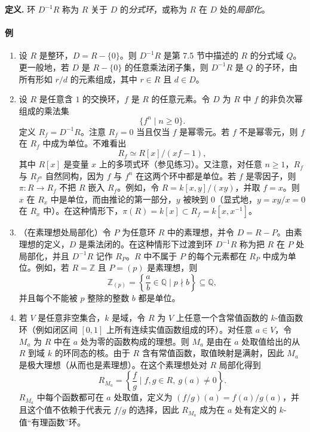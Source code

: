 \noindent\textbf{定义.} 环 $D^{-1}R$ 称为 $R$ 关于 $D$ 的\emph{分式环}，或称为 $R$ 在 $D$ 处的\emph{局部化}。

\paragraph{例}
\begin{enumerate}[label=(\arabic*)]
	\item 设 $R$ 是整环，$D=R-\{0\}$。则 $D^{-1}R$ 是第 7.5 节中描述的 $R$ 的分式域 $Q$。更一般地，若 $D$ 是 $R-\{0\}$ 的任意乘法闭子集，则 $D^{-1}R$ 是 $Q$ 的子环，由所有形如 $r/d$ 的元素组成，其中 $r\in R$ 且 $d\in D$。
	
	\item 设 $R$ 是任意含 $1$ 的交换环，$f$ 是 $R$ 的任意元素。令 $D$ 为 $R$ 中 $f$ 的非负次幂组成的乘法集
	\[
	\{f^n\mid n\ge0\}.
	\]
	定义 $R_f=D^{-1}R$。注意 $R_f=0$ 当且仅当 $f$ 是幂零元。若 $f$ 不是幂零元，则 $f$ 在 $R_f$ 中成为单位。不难看出
	\[
	R_f\simeq R[x]/(xf-1),
	\]
	其中 $R[x]$ 是变量 $x$ 上的多项式环（参见练习）。又注意，对任意 $n\ge1$，$R_f$ 与 $R_{f^n}$ 自然同构，因为 $f$ 与 $f^n$ 在这两个环中都是单位。若 $f$ 是零因子，则 $\pi:R\to R_f$ 不把 $R$ 嵌入 $R_f$。例如，令 $R=k[x,y]/(xy)$，并取 $f=x$。则 $x$ 在 $R_x$ 中是单位，而由推论的第一部分，$y$ 被映到 $0$（显式地，$y=xy/x=0$ 在 $R_x$ 中）。在这种情形下，$\pi(R)=k[x]\subset R_f=k[x,x^{-1}]$。
	
	\item （在素理想处局部化）令 $P$ 为任意环 $R$ 中的素理想，并令 $D=R-P$。由素理想的定义，$D$ 是乘法闭的。在这种情形下过渡到环 $D^{-1}R$ 称为把 $R$ 在 $P$ 处局部化，并且 $D^{-1}R$ 记作 $R_P$。$R$ 中不属于 $P$ 的每个元素都在 $R_P$ 中成为单位。例如，若 $R=\mathbb Z$ 且 $P=(p)$ 是素理想，则
	\[
	\mathbb Z_{(p)}=\left\{\frac{a}{b}\in\mathbb Q\mid p\nmid b\right\}\subseteq\mathbb Q,
	\]
	并且每个不能被 $p$ 整除的整数 $b$ 都是单位。
	
	\item 若 $V$ 是任意非空集合，$k$ 是域，令 $R$ 为 $V$ 上任意一个含常值函数的 $k$-值函数环（例如闭区间 $[0,1]$ 上所有连续实值函数组成的环）。对任意 $a\in V$，令 $M_a$ 为 $R$ 中在 $a$ 处为零的函数构成的理想。则 $M_a$ 是由在 $a$ 处取值给出的从 $R$ 到域 $k$ 的环同态的核。由于 $R$ 含有常值函数，取值映射是满射，因此 $M_a$ 是极大理想（从而也是素理想）。在这个素理想处对 $R$ 局部化得到
	\[
	R_{M_a}=\left\{\frac{f}{g}\mid f,g\in R,\ g(a)\ne0\right\}.
	\]
	$R_{M_a}$ 中每个函数都可在 $a$ 处取值，定义为 $(f/g)(a)=f(a)/g(a)$，并且这个值不依赖于代表元 $f/g$ 的选择，因此 $R_{M_a}$ 成为在 $a$ 处有定义的 $k$-值“有理函数”环。
\end{enumerate}

